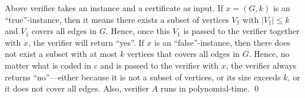 Above verifier takes an instance and a certificate as input.
If $x = (G, k)$ is an ``true''-instance, then it means there exists a subset of vertices $V_1$
with $|V_1| \le k$ and $V_1$ covers all edges in $G$.
Hence, once this $V_1$ is passed to the verifier together with $x$,
the verifier will return ``yes''.
If $x$ is an ``false''-instance, then there does not exist a subset with at most $k$ vertices
that covers all edges in $G$.
Hence, no matter what is coded in $c$ and is passed to the verifier with $x$,
the verifier always returns ``no''---either because it is not a subset of vertices,
or its size exceeds $k$,
or it does not cover all edges.  Also, verifier $A$ runs in polynomial-time.
\qed


